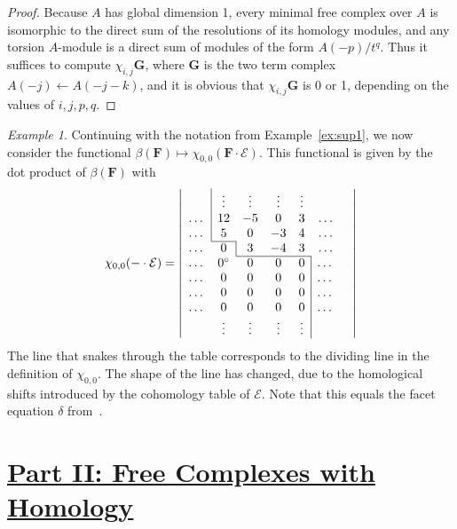 \documentclass[12pt]{amsart}
\theoremstyle{definition}
\theoremstyle{remark}
\newtheorem{example}[lemma]{Example}
\newcommand{\cE}{\mathcal{E}}
\newcommand{\FF}{\mathbf{F}}
\newcommand{\Gbull}{\mathbf{G}}
\newcommand{\zp}{\circ}
\begin{document}
\begin{proof} Because $A$ has global dimension 1, every minimal free complex
over $A$ is isomorphic to the direct sum of the resolutions of its homology modules, 
and any torsion $A$-module is a direct sum of modules of the form
 $A(-p)/t^q$. Thus it suffices to compute $\chi_{i,j}\Gbull$, where
$
\Gbull
$
is the two term complex
$A(-j)\leftarrow A(-j-k)$, and it is obvious that $\chi_{i,j}\Gbull$ is 0 or 1,
depending on the values of $i,j,p,q$.
\end{proof}



\begin{example}\label{ex:sup2}
Continuing with the notation from Example~\ref{ex:sup1}, we now consider the functional $\beta(\FF)\mapsto \chi_{0,0}(\FF\cdot \cE)$.  This functional is given by the dot product of $\beta(\FF)$ with
\[
\chi_{0,0}(-\cdot \cE)=
\left|
\begin{array}{ccccccc}
&\multicolumn{1}{|c}{\vdots}&\vdots&\vdots&\vdots&&\\
\dots&\multicolumn{1}{|c}{12}&-5&0&3&\dots\\
\dots&\multicolumn{1}{|c}{5}&0&-3&4&\dots\\ \cline{2-2}
\dots&{0}&\multicolumn{1}{|c}{3}&-4&3&\dots\\ \cline{3-5}
\dots&0^\zp&0&0&{0}&\multicolumn{1}{|c}{\dots}\\
\dots&0&0&0&0&\multicolumn{1}{|c}{\dots}\\
\dots&0&0&0&0&\multicolumn{1}{|c}{\dots}\\
\dots&0&0&0&0&\multicolumn{1}{|c}{\dots}\\
&\vdots&\vdots&\vdots&\vdots&\multicolumn{1}{|c}{}&\\
\end{array}
\right|
\]
The line that snakes through the table corresponds to the dividing line in the definition of $\chi_{0,0}$. The shape of the line has changed, due to the homological shifts introduced by the cohomology table of $\cE$.  Note that this equals the facet equation $\delta$ from~\cite[\S3]{eis-schrey-icm}.
\end{example}

\section*{\underline{{Part II: Free Complexes with Homology}}}
\end{document}
